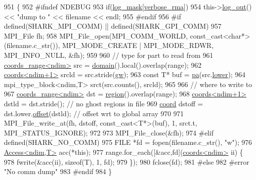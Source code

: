 \begin{DoxyCode}
951                                                                            \{
952 \textcolor{preprocessor}{#ifndef NDEBUG}
953         \textcolor{keywordflow}{if}(\hyperlink{namespaceshark_a110e03e8104b06caef346fcc25621aa9}{log\_mask}[\hyperlink{namespaceshark_a8faafcaa495b6cf0c0eca37a846e45f2}{verbose\_rma}])
954                 this->\hyperlink{classshark_1_1ndim_1_1_global_array_ae56b93f4ac19003102749015275a6d0c}{log\_out}() << \textcolor{stringliteral}{"dump to "} << filename << endl;
955 \textcolor{preprocessor}{#endif}
956 \textcolor{preprocessor}{#if defined(SHARK\_MPI\_COMM) || defined(SHARK\_GPI\_COMM)}
957         MPI\_File fh;
958         MPI\_File\_open(MPI\_COMM\_WORLD, const\_cast<char*>(filename.c\_str()), MPI\_MODE\_CREATE | MPI\_MODE\_RDWR,
       MPI\_INFO\_NULL, &fh);
959 
960         \textcolor{comment}{// type for part to read from}
961         \hyperlink{structshark_1_1ndim_1_1coords__range}{coords\_range<ndim>} src = \hyperlink{classshark_1_1ndim_1_1_global_array_a435ee8ff23c3feadf2ef2be64d4f375c}{domain}().local().overlap(range);
962         \hyperlink{structshark_1_1ndim_1_1coords}{coords<ndim+1>} srcld = src.stride(\hyperlink{classshark_1_1ndim_1_1_global_array_a38d93d114d585e5e5491c5ecd35c6bfc}{gw});
963         \textcolor{keyword}{const} T* buf = \hyperlink{classshark_1_1ndim_1_1_global_array_a31a8a5247cc8adbe0602a83de759d915}{pa}(src.\hyperlink{structshark_1_1ndim_1_1coords__range_a46cae2c424d7b20f911a970c92581b19}{lower});
964         mpi\_type\_block<ndim,T> srct(src.counts(), srcld);
965         
966         \textcolor{comment}{// where to write to}
967         \hyperlink{structshark_1_1ndim_1_1coords__range}{coords\_range<ndim>} dst = \hyperlink{classshark_1_1ndim_1_1_global_array_a40939e7384b55a49b59c63dc717224d2}{region}().overlap(range);
968         \hyperlink{structshark_1_1ndim_1_1coords}{coords<ndim+1>} dstld = dst.stride(); \textcolor{comment}{// no ghost regions in file}
969         \hyperlink{namespaceshark_a767a92d5dd82cb82266473bff42fa6d9}{coord} dstoff = dst.lower.\hyperlink{structshark_1_1ndim_1_1coords_a0c905dc9ae7a2ea1c3a8cd4aaf542d73}{offset}(dstld); \textcolor{comment}{// offset wrt to global array}
970         
971         MPI\_File\_write\_at(fh, dstoff, const\_cast<T*>(buf), 1, srct.t, MPI\_STATUS\_IGNORE);
972 
973         MPI\_File\_close(&fh);
974 \textcolor{preprocessor}{#elif defined(SHARK\_NO\_COMM)}
975         FILE *fd = fopen(filename.c\_str(), \textcolor{stringliteral}{"w"});
976         \hyperlink{classshark_1_1ndim_1_1_access}{Access<ndim,T>} acc(*\textcolor{keyword}{this});
977     range.for\_each([&acc,fd](\hyperlink{structshark_1_1ndim_1_1coords}{coords<ndim>} ii) \{
978                 fwrite(&acc(ii), \textcolor{keyword}{sizeof}(T), 1, fd);
979     \});
980         fclose(fd);
981 \textcolor{preprocessor}{#else}
982 \textcolor{preprocessor}{#error "No comm dump"}
983 \textcolor{preprocessor}{#endif}
984 \}
\end{DoxyCode}
\hypertarget{classshark_1_1ndim_1_1_global_array_ac7949ae0526bc0a8ca3b7a3561a3b788}{}\label{classshark_1_1ndim_1_1_global_array_ac7949ae0526bc0a8ca3b7a3561a3b788} 
